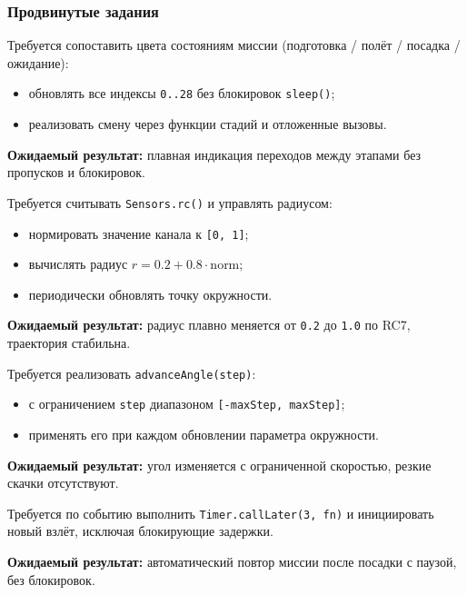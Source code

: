 \subsubsection{Продвинутые задания}

\begin{taskbox}
Требуется сопоставить цвета состояниям миссии (подготовка / полёт / посадка / ожидание):
\begin{itemize}
    \item обновлять все индексы \texttt{0..28} без блокировок \texttt{sleep()};
    \item реализовать смену через функции стадий и отложенные вызовы.
\end{itemize}

\textbf{Ожидаемый результат:} плавная индикация переходов между этапами без пропусков и блокировок.
\end{taskbox}

\begin{taskbox}
Требуется считывать \texttt{Sensors.rc()} и управлять радиусом:
\begin{itemize}
    \item нормировать значение канала к \texttt{[0, 1]};
    \item вычислять радиус \(r = 0.2 + 0.8 \cdot \text{norm}\);
    \item периодически обновлять точку окружности.
\end{itemize}

\textbf{Ожидаемый результат:} радиус плавно меняется от \texttt{0.2} до \texttt{1.0} по RC7, траектория стабильна.
\end{taskbox}

\begin{taskbox}
Требуется реализовать \texttt{advanceAngle(step)}:
\begin{itemize}
    \item с ограничением \texttt{step} диапазоном \texttt{[-maxStep, maxStep]};
    \item применять его при каждом обновлении параметра окружности.
\end{itemize}

\textbf{Ожидаемый результат:} угол изменяется с ограниченной скоростью, резкие скачки отсутствуют.
\end{taskbox}

\begin{taskbox}
Требуется по событию выполнить \texttt{Timer.callLater(3, fn)} и инициировать новый взлёт, исключая блокирующие задержки.

\textbf{Ожидаемый результат:} автоматический повтор миссии после посадки с паузой, без блокировок.
\end{taskbox}

